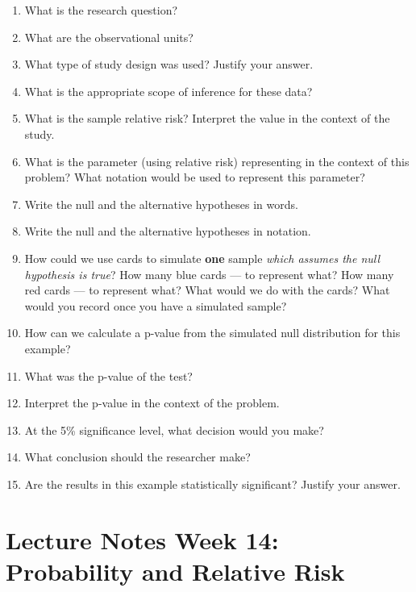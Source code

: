 \documentclass[
]{report}
\newcommand{\rgs}{\vspace{12pt}} %
\begin{document}
\begin{enumerate}
\def\labelenumi{\arabic{enumi}.}
\item
  What is the research question?
  \rgs
\item
  What are the observational units?
  \rgs
\item
  What type of study design was used? Justify your answer.
  \rgs
\item
  What is the appropriate scope of inference for these data?
  \rgs
\item
  What is the sample relative risk? Interpret the value in the context of the study.
  \rgs
  \rgs
\item
  What is the parameter (using relative risk) representing in the context of this problem? What notation would be used to represent this parameter?
  \rgs
  \rgs
\item
  Write the null and the alternative hypotheses in words.
  \rgs
  \rgs
\item
  Write the null and the alternative hypotheses in notation.
  \rgs
\item
  How could we use cards to simulate \textbf{one} sample \emph{which assumes the null hypothesis is true}? How many blue cards --- to represent what? How many red cards --- to represent what? What would we do with the cards? What would you record once you have a simulated sample?
  \rgs
  \rgs
  \rgs
\item
  How can we calculate a p-value from the simulated null distribution for this example?
  \rgs
  \rgs
\item
  What was the p-value of the test?
  \rgs
\item
  Interpret the p-value in the context of the problem.
  \rgs
  \rgs
\item
  At the 5\% significance level, what decision would you make?
  \rgs
\item
  What conclusion should the researcher make?
  \rgs
  \rgs
\item
  Are the results in this example statistically significant? Justify your answer.
  \rgs
\end{enumerate}

\newpage

\hypertarget{lecture-notes-week-14-probability-and-relative-risk}{%
\section{Lecture Notes Week 14: Probability and Relative Risk}\label{lecture-notes-week-14-probability-and-relative-risk}}
\end{document}
